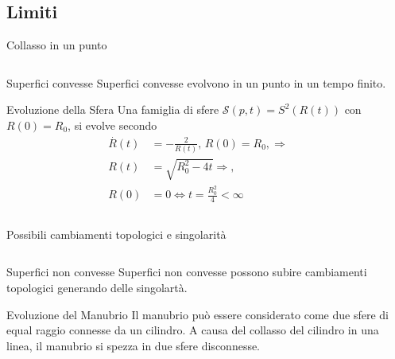 \subsection*{Limiti}
\begin{frame}{Collasso in un punto}
  \begin{columns}[c]
    \begin{column}{6cm}
      \begin{block}{Superfici convesse}
       Superfici convesse  evolvono in un
       punto in un tempo finito.
       \end{block}
      \begin{exampleblock}{Evoluzione della Sfera}
        Una famiglia di sfere $\mathcal{S}(p,t)=S^2(R(t))$ con
        $R(0)=R_0$, si evolve secondo
        \[
        \begin{aligned}
          \overset{\displaystyle.}{R}(t) &= -\frac{2}{R(t)},\,
          R(0)=R_0,\Rightarrow\\
          R(t)&=\sqrt{R_0^2-4t}\Rightarrow, \\
          R(0)&=0 \Longleftrightarrow t=\frac{R_0^2}{4}<\infty 
        \end{aligned}
        \]
      \end{exampleblock}
    \end{column}
    \begin{column}[c]{4cm}
       \begin{center}
     \end{center}
    \end{column}
    \end{columns}
\end{frame}
\begin{frame}{Possibili cambiamenti topologici e singolarità}
  \begin{columns}[c]
    \begin{column}{5cm}
      \begin{block}{Superfici non convesse}
       Superfici non convesse possono subire cambiamenti topologici
       generando delle singolartà. 
       \end{block}
      \begin{exampleblock}{Evoluzione del Manubrio}
        Il manubrio può essere considerato come due sfere di equal
        raggio connesse da un cilindro. A causa del collasso del
        cilindro in una linea, il manubrio si spezza in due sfere
        disconnesse.
      \end{exampleblock}
    \end{column}
    \begin{column}[c]{5cm}
       \begin{center}
     \end{center}
    \end{column}
    \end{columns}
\end{frame}

